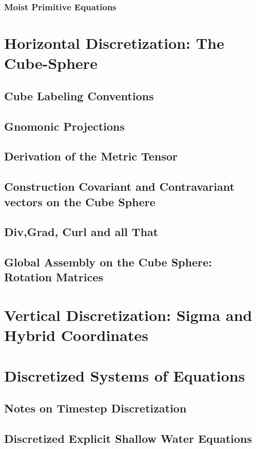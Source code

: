 \documentclass[12pt]{article}
\numberwithin{equation}{section}
\begin{document}
\subsubsection{Moist Primitive Equations}

\section{Horizontal Discretization: The Cube-Sphere}
\subsection{Cube Labeling Conventions}
\subsection{Gnomonic Projections}
\subsection{Derivation of the Metric Tensor}
\subsection{Construction Covariant and Contravariant vectors on the Cube Sphere}
\subsection{Div,Grad, Curl and all That}
\subsection{Global Assembly on the Cube Sphere: Rotation Matrices}

\section{Vertical Discretization: Sigma and Hybrid Coordinates}

\section{Discretized Systems of Equations}

\subsection{Notes on Timestep Discretization}
\subsection{ Discretized Explicit Shallow Water Equations}
\end{document}
